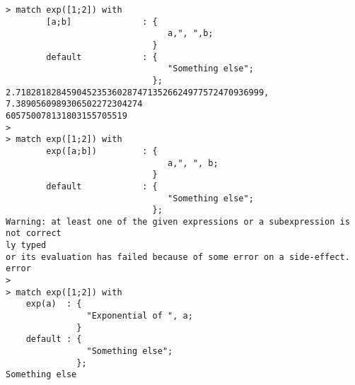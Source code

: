 \begin{center}\begin{minipage}{15cm}\begin{Verbatim}[frame=single]
> match exp([1;2]) with 
        [a;b]              : {
                                a,", ",b;
                             }
        default            : {
                                "Something else";
                             };
2.7182818284590452353602874713526624977572470936999, 7.3890560989306502272304274
605750078131803155705519
> 
> match exp([1;2]) with 
        exp([a;b])         : {
                                a,", ", b;
                             }
        default            : {
                                "Something else";
                             };
Warning: at least one of the given expressions or a subexpression is not correct
ly typed
or its evaluation has failed because of some error on a side-effect.
error
> 
> match exp([1;2]) with 
    exp(a)  : {
                "Exponential of ", a;
              }
    default : {
                "Something else";
              };
Something else
\end{Verbatim}
\end{minipage}\end{center}
